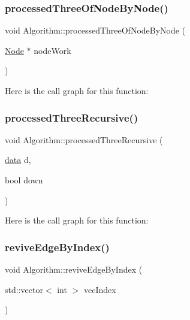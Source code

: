 \subsubsection{\texorpdfstring{processed\+Three\+Of\+Node\+By\+Node()}{processedThreeOfNodeByNode()}}
{\footnotesize\ttfamily void Algorithm\+::processed\+Three\+Of\+Node\+By\+Node (\begin{DoxyParamCaption}\item[{\mbox{\hyperlink{class_node}{Node}} $\ast$}]{node\+Work }\end{DoxyParamCaption})}

Here is the call graph for this function\+:
\mbox{\label{struct_algorithm_a6194b1be053438237fcdbd91fce6e8b0}} 
\subsubsection{\texorpdfstring{processed\+Three\+Recursive()}{processedThreeRecursive()}}
{\footnotesize\ttfamily void Algorithm\+::processed\+Three\+Recursive (\begin{DoxyParamCaption}\item[{\mbox{\hyperlink{_graph_8h_a98cbe1f79429fc62806b32b6e8871d9e}{data}}}]{d,  }\item[{bool}]{down }\end{DoxyParamCaption})}

Here is the call graph for this function\+:
\mbox{\label{struct_algorithm_a698172d74eea712bc92a75375a1de946}} 
\subsubsection{\texorpdfstring{revive\+Edge\+By\+Index()}{reviveEdgeByIndex()}}
{\footnotesize\ttfamily void Algorithm\+::revive\+Edge\+By\+Index (\begin{DoxyParamCaption}\item[{std\+::vector$<$ int $>$}]{vec\+Index }\end{DoxyParamCaption})}

\mbox{\label{struct_algorithm_a3254a9cd92b951a41d1d9cd931e6672b}} 
